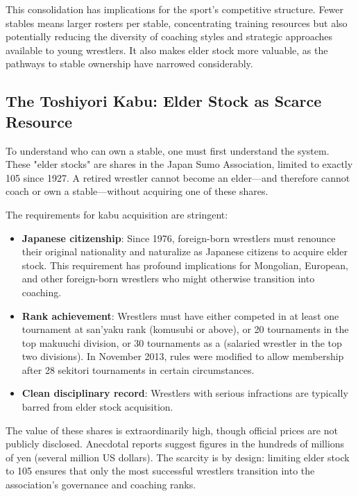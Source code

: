 This consolidation has implications for the sport's competitive structure. Fewer stables means larger rosters per stable, concentrating training resources but also potentially reducing the diversity of coaching styles and strategic approaches available to young wrestlers. It also makes elder stock more valuable, as the pathways to stable ownership have narrowed considerably.

\subsection{The Toshiyori Kabu: Elder Stock as Scarce Resource}

To understand who can own a stable, one must first understand the  system. These "elder stocks" are shares in the Japan Sumo Association, limited to exactly 105 since 1927. A retired wrestler cannot become an elder—and therefore cannot coach or own a stable—without acquiring one of these shares.

The requirements for kabu acquisition are stringent:

\begin{itemize}
\item \textbf{Japanese citizenship}: Since 1976, foreign-born wrestlers must renounce their original nationality and naturalize as Japanese citizens to acquire elder stock. This requirement has profound implications for Mongolian, European, and other foreign-born wrestlers who might otherwise transition into coaching.
\item \textbf{Rank achievement}: Wrestlers must have either competed in at least one tournament at san'yaku rank (komusubi or above), or 20 tournaments in the top makuuchi division, or 30 tournaments as a  (salaried wrestler in the top two divisions). In November 2013, rules were modified to allow membership after 28 sekitori tournaments in certain circumstances.
\item \textbf{Clean disciplinary record}: Wrestlers with serious infractions are typically barred from elder stock acquisition.
\end{itemize}

The value of these shares is extraordinarily high, though official prices are not publicly disclosed. Anecdotal reports suggest figures in the hundreds of millions of yen (several million US dollars). The scarcity is by design: limiting elder stock to 105 ensures that only the most successful wrestlers transition into the association's governance and coaching ranks.

